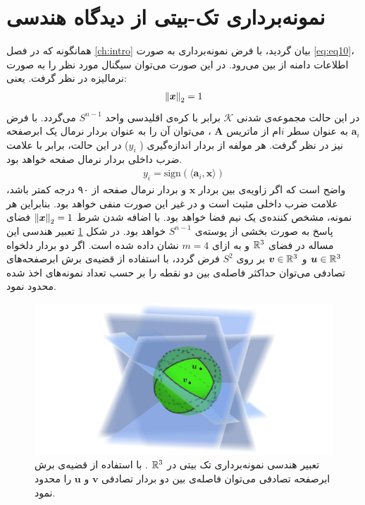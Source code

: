 \section{نمونه‌برداری تک-بیتی از دیدگاه هندسی}
همانگونه که در فصل
\ref{ch:intro}
بیان گردید، با فرض نمونه‌برداری به صورت
\eqref{eq:eq10}،
اطلاعات دامنه از بین می‌رود. در این صورت می‌توان سیگنال مورد نظر را به صورت نرمالیزه در نظر گرفت. یعنی:
\begin{align}
\left\lVert\bm{x}\right\rVert_{2}=1
\end{align}
در این حالت مجموعه‌ی شدنی 
$\mathcal{K}$
برابر با کره‌ی اقلیدسی واحد
$S^{n-1}$
می‌گردد. با فرض 
$\bm{a}_{i}$
به عنوان سطر 
$i$ام 
از ماتریس
$\bm{A}$
، می‌توان آن را به عنوان بردار نرمال یک ابرصفحه نیز در نظر گرفت. هر مولفه از بردار اندازه‌گیری (
$y_{i}$)
در این حالت، برابر با علامت ضرب داخلی بردار نرمال صفحه خواهد بود.
\begin{align}
y_{i} = \text{sign}(\langle\bm{a}_{i}, \bm{x}\rangle)
\end{align}
واضح است که اگر زاویه‌ی بین بردار
$\bm{x}$
و بردار نرمال صفحه از ۹۰ درجه کمتر باشد، علامت ضرب داخلی مثبت است و در غیر این صورت منفی خواهد بود. بنابراین هر نمونه، مشخص کننده‌ی یک نیم فضا خواهد بود. با اضافه شدن شرط 
$\left\lVert\bm{x}\right\rVert_{2}=1$
فضای پاسخ به صورت بخشی از پوسته‌ی 
$S^{n-1}$
خواهد بود. در شکل
\ref{fig11}
تعبیر هندسی این مساله در فضای
$\mathbb{R}^{3}$
و به ازای
$m=4$
نشان داده شده است. اگر دو بردار دلخواه
$\bm{u}\in \mathbb{R}^{3}$
و
$\bm{v}\in \mathbb{R}^{3}$
بر روی 
$S^{2}$
فرض گردد، با استفاده از قضیه‌ی برش ابرصفحه‌های تصادفی می‌توان حداکثر فاصله‌ی بین دو نقطه را بر حسب تعداد نمونه‌های اخذ شده محدود نمود.

\begin{figure}
\centering
\includegraphics[scale=1.3]{Images/ch2/fig11.png}
\caption{تعبیر هندسی نمونه‌برداری تک بیتی
در 
$\mathbb{R}^3$
. با استفاده از قضیه‌ی برش ابرصفحه تصادفی می‌توان فاصله‌ی بین دو بردار تصادفی 
$\bm{v}$
و
$\bm{u}$
را محدود نمود.}
\label{fig11}
\end{figure}

